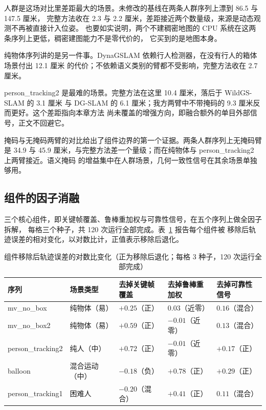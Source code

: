 人群是这场对比里差距最大的场景。未修改的基线在两条人群序列上漂到 86.5 与 147.5 厘米，
完整方法收在 2.3 与 2.2 厘米，差距接近两个数量级，来源是动态观测不再被直接计入位姿。
也要如实说明，两个不建稠密地图的 CPU 系统在这两条序列上更低，稠密建图能力不是零代价的，
它买到的是地图本身。

纯物体序列讲的是另一件事。DynaGSLAM 依赖行人检测器，在没有行人的箱体场景付出 12.1 厘米
的代价；不依赖语义类别的臂都不受影响，完整方法收在 2.7 厘米。

person\_tracking2 是最难的场景。完整方法在这里 10.4 厘米，落后于 WildGS-SLAM 的 3.1 厘米
与 DG-SLAM 的 6.1 厘米；我方两臂中不带掩码的 9.3 厘米反而更好。这个差距指向本章方法
尚未覆盖的增强方向，即融合额外的单目外部信号，正文不回避它。

掩码与无掩码两臂的对比给出了组件边界的第一个证据。两条人群序列上无掩码臂是 34.9 与
45.9 厘米，与完整方法差一个量级；而在纯物体与 person\_tracking2 上两臂接近。语义掩码
的增益集中在人群场景，几何一致性信号在其余场景单独够用。

\subsection{组件的因子消融}

三个核心组件，即关键帧覆盖、鲁棒重加权与可靠性信号，在五个序列上做全因子拆解，
每格三个种子，共 120 次运行全部完成。表~\ref{tab:study1-factorial} 报告每个组件被
移除后轨迹误差的相对变化，以对数比计，正值表示移除后退化。

\begin{table}[htbp]
\centering
\small
\caption{组件移除后轨迹误差的对数比变化（正为移除后退化；每格 3 种子，120 次运行全部完成）}
\label{tab:study1-factorial}
\begin{tabular}{lllll}
\toprule
序列 & 场景类型 & 去掉关键帧覆盖 & 去掉鲁棒重加权 & 去掉可靠性信号 \\
\midrule
mv\_no\_box & 纯物体（易） & $+0.25$（正） & $0.03$（近零） & $0.16$（混合） \\
mv\_no\_box2 & 纯物体（易） & $+0.59$（正） & $-0.01$（近零） & $0.13$（混合） \\
person\_tracking2 & 纯人（中） & $+0.72$（正） & $-0.01$（近零） & $+0.17$（正） \\
balloon & 混合运动（中） & $-0.18$（负） & $+0.78$（正） & $+0.29$（正） \\
person\_tracking1 & 困难人 & $-0.20$（混合） & $+0.41$（正） & $0.11$（混合） \\
\bottomrule
\end{tabular}
\end{table}

